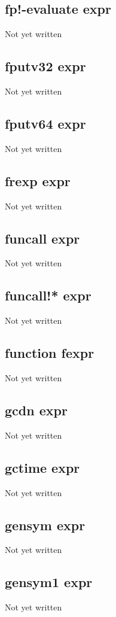 \documentclass[a4paper,11pt]{article}
\begin{document}
{\subsection{\ttfamily fp!-evaluate expr}
   Not yet written

\subsection{\ttfamily fputv32 expr}
   Not yet written

\subsection{\ttfamily fputv64 expr}
   Not yet written

\subsection{\ttfamily frexp expr}
   Not yet written

\subsection{\ttfamily funcall expr}
   Not yet written

\subsection{\ttfamily funcall!* expr}
   Not yet written

\subsection{\ttfamily function fexpr}
   Not yet written

\subsection{\ttfamily gcdn expr}
   Not yet written

\subsection{\ttfamily gctime expr}
   Not yet written

\subsection{\ttfamily gensym expr}
   Not yet written

\subsection{\ttfamily gensym1 expr}
   Not yet written

}
\end{document}
